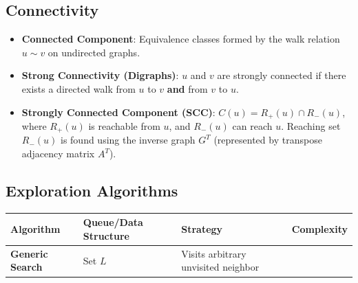 \documentclass[
]{book}
\newcounter{none} %
\theoremstyle{definition}
\theoremstyle{definition}
\theoremstyle{definition}
\theoremstyle{definition}
\theoremstyle{remark}
\begin{document}
\subsection{Connectivity}\label{connectivity}

\begin{itemize}
\item
  \textbf{Connected Component}: Equivalence classes formed by the walk relation \(u \sim v\) on undirected graphs.
\item
  \textbf{Strong Connectivity (Digraphs)}: \(u\) and \(v\) are strongly connected if there exists a directed walk from \(u\) to \(v\) \textbf{and} from \(v\) to \(u\).
\item
  \textbf{Strongly Connected Component (SCC)}: \(C(u) = R_+(u) \cap R_-(u)\), where \(R_+(u)\) is reachable from \(u\), and \(R_-(u)\) can reach \(u\). Reaching set \(R_-(u)\) is found using the inverse graph \(G^T\) (represented by transpose adjacency matrix \(A^T\)).
\end{itemize}

\subsection{Exploration Algorithms}\label{exploration-algorithms}

{\def\LTcaptype{none} %
\begin{longtable}[]{@{}
  >{\raggedright\arraybackslash}p{}
  >{\raggedright\arraybackslash}p{}
  >{\raggedright\arraybackslash}p{}
  >{\raggedright\arraybackslash}p{}@{}}
\toprule\noalign{}
\begin{minipage}[b]{\linewidth}\raggedright
Algorithm
\end{minipage} & \begin{minipage}[b]{\linewidth}\raggedright
Queue/Data Structure
\end{minipage} & \begin{minipage}[b]{\linewidth}\raggedright
Strategy
\end{minipage} & \begin{minipage}[b]{\linewidth}\raggedright
Complexity
\end{minipage} \\
\midrule\noalign{}
\endhead
\bottomrule\noalign{}
\endlastfoot
\textbf{Generic Search} & Set \(L\) & Visits arbitrary unvisited neighbor & \\
\end{longtable}
}
\end{document}
